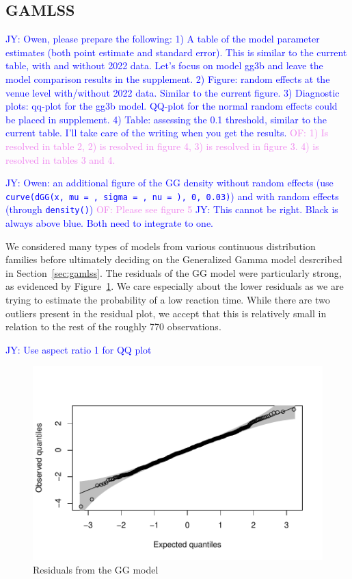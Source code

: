\documentclass[12pt, letterpaper]{article}
\newcommand{\jy}[1]{\textcolor{blue}{JY: #1}}
\newcommand{\of}[1]{\textcolor{violet}{OF: #1}}
\begin{document}
\subsection{GAMLSS} \label{subsec:Results_GLMM}

\jy{Owen, please prepare the following:
1) A table of the model parameter estimates (both point estimate and
standard error). This is similar to the current table, with and
without 2022 data. Let's focus on model gg3b and leave the model
comparison results in the supplement.
2) Figure: random effects at the venue level with/without 2022
data. Similar to the current figure.
3) Diagnostic plots: qq-plot for the gg3b model. QQ-plot for the
normal random effects could be placed in supplement.
4) Table: assessing the 0.1 threshold, similar to the current table.
I'll take care of the writing when you get the results.}
\of{1) Is resolved in table 2, 2) is resolved in figure 4, 3) is resolved in
figure 3. 4) is resolved in tables 3 and 4.}

\jy{Owen: an additional figure of the GG density without random
  effects (use \texttt{curve(dGG(x, mu = , sigma = , nu =  ), 0, 0.03)}) and
  with random effects (through \texttt{density()})}
\of{Please see figure 5}
\jy{This cannot be right. Black is always above blue. Both need to
  integrate to one.}

We considered many types of models from various continuous distribution families
before ultimately deciding on the Generalized Gamma model desrcribed in
Section~\ref{sec:gamlss}.  The residuals of the GG model were particularly
strong, as evidenced by Figure~\ref{fig:Residuals}.  We care especially about
the lower residuals as we are trying to estimate the probability of a low reaction
time.  While there are two outliers present in the residual plot, we accept that
this is relatively small in relation to the rest of the roughly 770 observations.

\jy{Use aspect ratio 1 for QQ plot}

\begin{figure}[tbp]
  \centering
  \includegraphics{GGResiduals}
  \caption{Residuals from the GG model}
  \label{fig:Residuals}
\end{figure}
\end{document}
